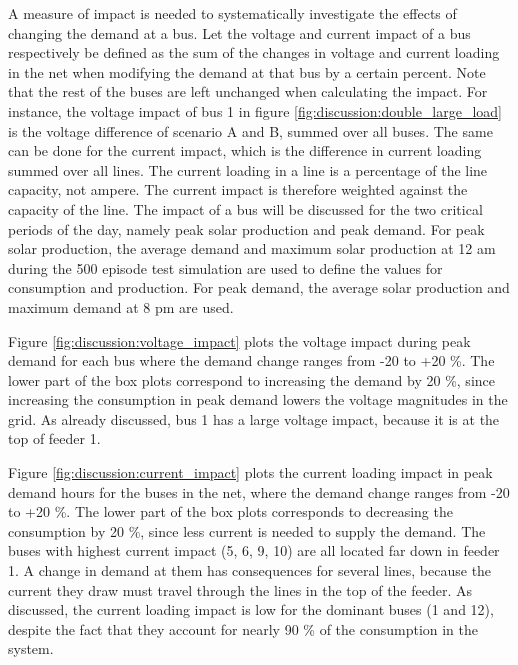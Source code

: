 \documentclass[class=book, crop=false, 11pt]{standalone}
\begin{document}
A measure of impact is needed to systematically investigate the effects of changing the demand at a bus. Let the voltage and current impact of a bus respectively be defined as the sum of the changes in voltage and current loading in the net when modifying the demand at that bus by a certain percent. Note that the rest of the buses are left unchanged when calculating the impact. For instance, the voltage impact of bus 1 in figure \ref{fig:discussion:double_large_load} is the voltage difference of scenario A and B, summed over all buses. The same can be done for the current impact, which is the difference in current loading summed over all lines. The current loading in a line is a percentage of the line capacity, not ampere. The current impact is therefore weighted against the capacity of the line. The impact of a bus will be discussed for the two critical periods of the day, namely peak solar production and peak demand. For peak solar production, the average demand and maximum solar production at 12 am during the 500 episode test simulation are used to define the values for consumption and production. For peak demand, the average solar production and maximum demand at 8 pm are used. 


Figure \ref{fig:discussion:voltage_impact} plots the voltage impact during peak demand for each bus where the demand change ranges from -20 to +20 \%. The lower part of the box plots correspond to increasing the demand by 20 \%, since increasing the consumption in peak demand lowers the voltage magnitudes in the grid. As already discussed, bus 1 has a large voltage impact, because it is at the top of feeder 1. 


Figure \ref{fig:discussion:current_impact} plots the current loading impact in peak demand hours for the buses in the net, where the demand change ranges from -20 to +20 \%. The lower part of the box plots corresponds to decreasing the consumption by 20 \%, since less current is needed to supply the demand. The buses with highest current impact (5, 6, 9, 10) are all located far down in feeder 1. A change in demand at them has consequences for several lines, because the current they draw must travel through the lines in the top of the feeder. As discussed, the current loading impact is low for the dominant buses (1 and 12), despite the fact that they account for nearly 90 \% of the consumption in the system. 
\end{document}
